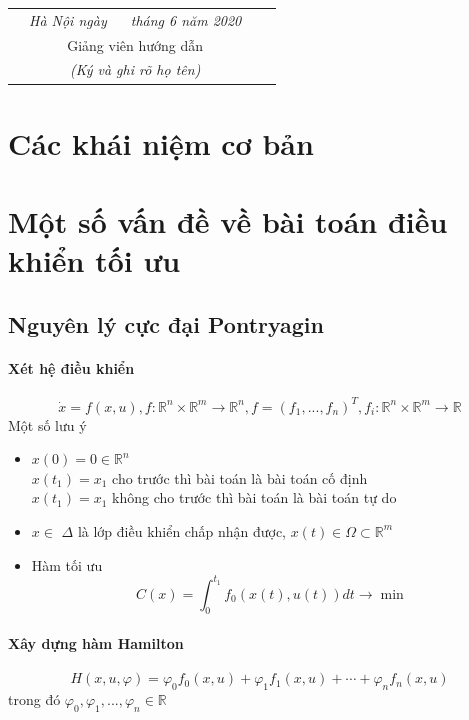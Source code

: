 \documentclass[12pt,a4paper]{report}
\begin{document}
	\begin{flushright}
		\begin{tabular}{cccc}
			&   \textit{ Hà Nội ngày $\quad$ tháng  6 năm 2020} && \\ 
			&    Giảng viên hướng dẫn && \\ 
			&    \textit{(Ký và ghi rõ họ tên)} && \\ 
		\end{tabular} 
	\end{flushright}
		\tableofcontents
	\chapter{Các khái niệm cơ bản}
	
	\chapter{Một số vấn đề về  bài toán điều khiển tối ưu}
	\section{Nguyên lý cực đại Pontryagin}
	\subsubsection{Xét hệ điều khiển} \begin{equation}
		\dot{x} = f(x, u), f: \mathbb{R}^n \times \mathbb{R}^m \to \mathbb{R}^n, f = (f_1, ..., f_n)^T, f_i: \mathbb{R}^n \times \mathbb{R}^m \to \mathbb{R}
	\end{equation}
	Một số lưu ý
	\begin{itemize}
		\item $x(0) = 0 \in \mathbb{R}^n$ \\ $x(t_1) = x_1$ cho trước thì bài toán là bài toán cố định \\ $x(t_1) = x_1$ không cho trước thì bài toán là bài toán tự do
		\item $x \in$ $\Delta$ là lớp điều khiển chấp nhận được, $x(t) \in \Omega \subset \mathbb{R}^m$
		\item Hàm tối ưu \begin{equation}
			C(x) = \int_{0}^{t_1}f_0(x(t), u(t))dt \to \min \nonumber
		\end{equation}
	\end{itemize}
	\subsubsection{Xây dựng hàm Hamilton}
	\begin{equation}
		H(x, u, \varphi) = \varphi_0f_0(x, u) + \varphi_1f_1(x, u) + \cdots + \varphi_nf_n(x, u)
	\end{equation} trong đó $\varphi_0, \varphi_1, ..., \varphi_n \in \mathbb{R}$
\end{document}
